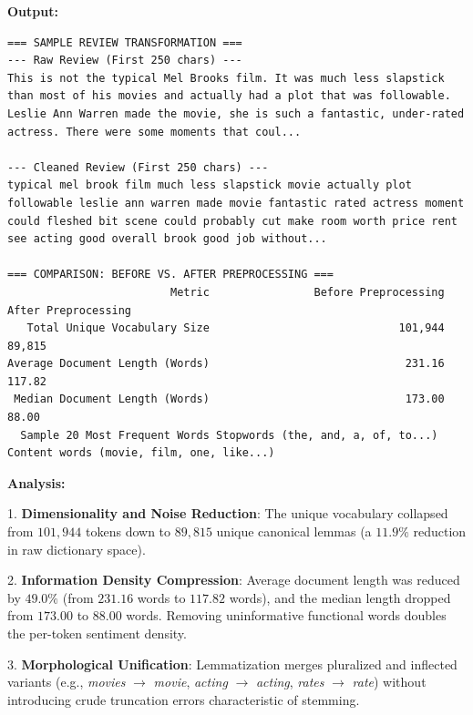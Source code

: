 \documentclass[12pt]{article}
\begin{document}
\textbf{Output:}

\begin{lstlisting}[style=output]
=== SAMPLE REVIEW TRANSFORMATION ===
--- Raw Review (First 250 chars) ---
This is not the typical Mel Brooks film. It was much less slapstick than most of his movies and actually had a plot that was followable. Leslie Ann Warren made the movie, she is such a fantastic, under-rated actress. There were some moments that coul...

--- Cleaned Review (First 250 chars) ---
typical mel brook film much less slapstick movie actually plot followable leslie ann warren made movie fantastic rated actress moment could fleshed bit scene could probably cut make room worth price rent see acting good overall brook good job without...

=== COMPARISON: BEFORE VS. AFTER PREPROCESSING ===
                         Metric                Before Preprocessing                       After Preprocessing
   Total Unique Vocabulary Size                             101,944                                    89,815
Average Document Length (Words)                              231.16                                    117.82
 Median Document Length (Words)                              173.00                                     88.00
  Sample 20 Most Frequent Words Stopwords (the, and, a, of, to...)  Content words (movie, film, one, like...)
\end{lstlisting}

\textbf{Analysis:}

1. \textbf{Dimensionality and Noise Reduction}: The unique vocabulary collapsed from $101,944$ tokens down to $89,815$ unique canonical lemmas (a $11.9\%$ reduction in raw dictionary space).

2. \textbf{Information Density Compression}: Average document length was reduced by $49.0\%$ (from $231.16$ words to $117.82$ words), and the median length dropped from $173.00$ to $88.00$ words. Removing uninformative functional words doubles the per-token sentiment density.

3. \textbf{Morphological Unification}: Lemmatization merges pluralized and inflected variants (e.g., \textit{movies} $\to$ \textit{movie}, \textit{acting} $\to$ \textit{acting}, \textit{rates} $\to$ \textit{rate}) without introducing crude truncation errors characteristic of stemming.

\vspace{0.4cm}

\end{document}

